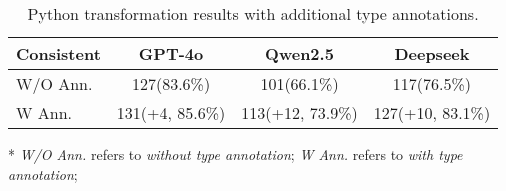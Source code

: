 \begin{table}[htb]
\centering
\caption{Python transformation results with additional type annotations.}
\label{tab:eva:add_type}
\begin{threeparttable}
\begin{tabular}{lccc}
\toprule[1.5pt]
\textbf{Consistent} & \textbf{GPT-4o} & \textbf{Qwen2.5} & \textbf{Deepseek} \\
\midrule[0.8pt]
W/O Ann. & 127(83.6\%) & 101(66.1\%) & 117(76.5\%)\\
W Ann. & 131(+4, 85.6\%) & 113(+12, 73.9\%) & 127(+10, 83.1\%) \\
\bottomrule[1.5pt]
\end{tabular}
\begin{tablenotes}
    \small
    \item[*] \textit{W/O Ann.} refers to \textit{without type annotation};
    \textit{W Ann.} refers to \textit{with type annotation};
\end{tablenotes}
\end{threeparttable}
\end{table}
